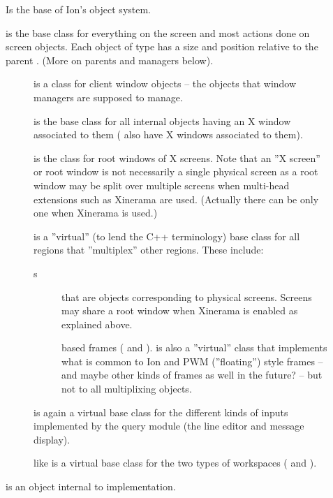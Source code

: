 \begin{description}
  \item[]
    Is the base of Ion's object system.
  \item[]
    is the base class for everything on the screen
    and most actions done on screen objects. Each object of type
      has a size and position relative to the parent
    . (More on parents and managers below).
    \begin{description}
      \item[] is a class for
	client window objects -- the objects that window managers are
	supposed to manage.
      \item[] is the base class for all
	internal objects having an X window associated to them
	( also have X windows associated to them).
	
      \item[] is the class for
	root windows of X screens.
	Note that an ''X screen'' or root window is not necessarily a
	single  physical screen as a root window
	may be split over multiple screens when multi-head extensions 
	such as Xinerama are used. (Actually there
	can be only one  when Xinerama is used.)
	
      \item[] is a ''virtual'' (to lend the C++ terminology)
	base class for all regions that ''multiplex'' other regions. These
	include:
	\begin{description}
           \item[s] that are objects
	     corresponding to physical screens. Screens may share a root
	     window when Xinerama is enabled as explained above.
           \item[] based frames
	     ( and ).
	      is also a ''virtual'' class that implements
	     what is common to Ion and PWM (''floating'') style frames --
	     and maybe other kinds of frames as well in the future? -- but
	     not to all multiplixing objects.
	\end{description}
      \item[] is again a virtual base class
	for the different kinds of inputs implemented by the query module
	(the line editor and message display).
      \item[] like  is a
	virtual base class for the two types of workspaces
	( and ).
    \end{description}
    
  \item[] is an object internal to
     implementation.
\end{description}


